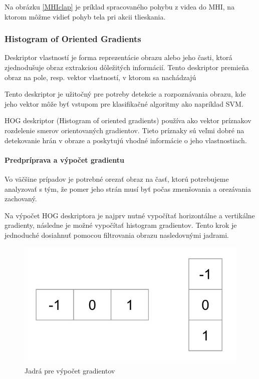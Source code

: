 Na obrázku \ref{MHIclap} je príklad spracovaného pohybu z videa do MHI, na ktorom môžme vidieť pohyb tela pri akcii tlieskania.

\subsubsection{Histogram of Oriented Gradients} \label{HOGlabel}
Deskriptor vlastností je forma reprezentácie obrazu alebo jeho časti, ktorá zjednodušuje obraz extrakciou dôležitých informácií. Tento deskriptor premieňa obraz na pole, resp. vektor vlastností, v ktorom sa nachádzajú

Tento deskriptor je užitočný  pre potreby detekcie a rozpoznávania obrazu, kde jeho vektor môže byť vstupom pre klasifikačné algoritmy ako napríklad SVM. 

HOG deskriptor (Histogram of oriented gradients) používa ako vektor príznakov rozdelenie smerov orientovaných gradientov. Tieto príznaky sú veľmi dobré na detekovanie hrán v obraze a poskytujú vhodné informácie o jeho vlastnostiach.

\paragraph{Predpríprava a výpočet gradientu}

Vo väčšine prípadov je potrebné orezať obraz na časť, ktorú potrebujeme analyzovať s tým, že pomer jeho strán musí byť počas zmenšovania a orezávania zachovaný. 

Na výpočet HOG deskriptora je najprv nutné vypočítať horizontálne a vertikálne gradienty, následne je možné vypočítať histogram gradientov. Tento krok je jednoduché dosiahnuť pomocou filtrovania obrazu nasledovnými jadrami.

\begin{figure}[H]
  \centering
  \includegraphics[width=12cm]{img/HOGkern.png}
  \caption{Jadrá pre výpočet gradientov \cite{c20}}
  \label{HOGkern}
\end{figure}

